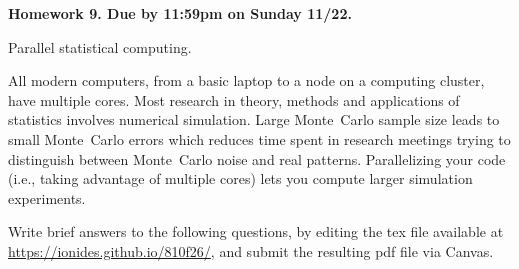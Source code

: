 \documentclass[12pt]{article}
\begin{document}
\begin{center}\bf
Homework 9. Due by 11:59pm on Sunday 11/22.

Parallel statistical computing.

\end{center}

All modern computers, from a basic laptop to a node on a computing cluster, have multiple cores.  Most research in theory, methods and applications of statistics involves numerical simulation. Large Monte~Carlo sample size leads to small Monte~Carlo errors which reduces time spent in research meetings trying to distinguish between Monte~Carlo noise and real patterns. Parallelizing your code (i.e., taking advantage of multiple cores) lets you compute larger simulation experiments.

Write brief answers to the following questions, by editing the tex file available at \url{https://ionides.github.io/810f26/}, and submit the resulting pdf file via Canvas. 
\end{document}
